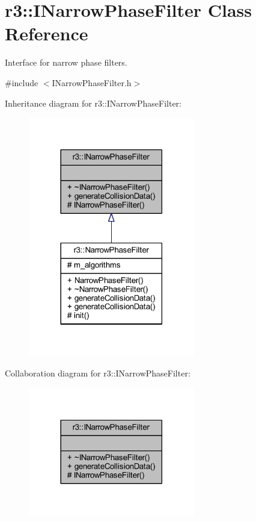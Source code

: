 \hypertarget{classr3_1_1_i_narrow_phase_filter}{}\section{r3\+:\+:I\+Narrow\+Phase\+Filter Class Reference}
\label{classr3_1_1_i_narrow_phase_filter}


Interface for narrow phase filters.  




{\ttfamily \#include $<$I\+Narrow\+Phase\+Filter.\+h$>$}



Inheritance diagram for r3\+:\+:I\+Narrow\+Phase\+Filter\+:\nopagebreak
\begin{figure}[H]
\begin{center}
\leavevmode
\includegraphics[width=206pt]{classr3_1_1_i_narrow_phase_filter__inherit__graph}
\end{center}
\end{figure}


Collaboration diagram for r3\+:\+:I\+Narrow\+Phase\+Filter\+:\nopagebreak
\begin{figure}[H]
\begin{center}
\leavevmode
\includegraphics[width=206pt]{classr3_1_1_i_narrow_phase_filter__coll__graph}
\end{center}
\end{figure}
